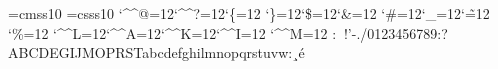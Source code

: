 \font\THFa=cmss10
\font\THFb=csss10
\begingroup
\catcode`\^^@=12\catcode`\^^?=12\catcode`\{=12
\catcode`\}=12\catcode`\$=12\catcode`\&=12
\catcode`\#=12\catcode`\_=12\catcode`\~=12
\catcode`\%=12
\catcode`\^^L=12\catcode`\^^A=12\catcode`\^^K=12\catcode`\^^I=12
\catcode`\^^M=12
\THFa:^^0b^^12!'-./0123456789:?ABCDEGIJMOPRSTabcdefghilmnopqrstuvw\endinclude{}\THFb:^^b8^^e9\endinclude\endgroup
